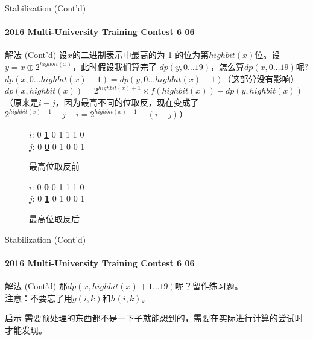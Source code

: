 \documentclass[hyperref={unicode=true}]{beamer}
\theoremstyle{definition}
\theoremstyle{proof}
\begin{document}
\begin{frame}{Stabilization (Cont'd)}\framesubtitle{2016 Multi-University Training Contest 6 06}
  \begin{exampleblock}{解法 (Cont'd)}
    设$x$的二进制表示中最高的为 1 的位为第$highbit(x)$位。设$y=x\oplus2^{highbit(x)}$，此时假设我们算完了 $dp(y, 0 \ldots 19)$，怎么算$dp(x,0 \ldots 19)$呢?\\
    \pause{}$dp(x, 0 \ldots highbit(x)-1) = dp(y, 0 \ldots highbit(x)-1)$（这部分没有影响）\\
    \pause{}$dp(x, highbit(x)) = 2^{highbit(x)+1} \times f(highbit(x)) - dp(y, highbit(x))$（原来是$i-j$，因为最高不同的位取反，现在变成了$2^{highbit(x)+1}+j-i=2^{highbit(x)+1}-(i-j)$）\\
    \pause{}\begin{minipage}{0.45\linewidth}
      \begin{figure}
        \begin{center}
          $i$: 0 {\bf\uline{1}} 0 1 1 1 0\\
          $j$: 0 {\bf\uline{0}} 0 1 0 0 1
        \end{center}
        \caption{最高位取反前}
      \end{figure}
    \end{minipage}
    \begin{minipage}{0.45\linewidth}
      \begin{figure}
        \begin{center}
          $i$: 0 {\bf\uline{0}} 0 1 1 1 0\\
          $j$: 0 {\bf\uline{1}} 0 1 0 0 1
        \end{center}
        \caption{最高位取反后}
      \end{figure}
    \end{minipage}
  \end{exampleblock}
\end{frame}

\begin{frame}{Stabilization (Cont'd)}\framesubtitle{2016 Multi-University Training Contest 6 06}
  \begin{exampleblock}{解法 (Cont'd)}
    那$dp(x, highbit(x)+1 \ldots 19)$呢？留作练习题。\\
    注意：不要忘了用$g(i,k)$和$h(i,k)$。
  \end{exampleblock}
  \begin{block}{启示}
    需要预处理的东西都不是一下子就能想到的，需要在实际进行计算的尝试时才能发现。
  \end{block}
\end{frame}
\end{document}
